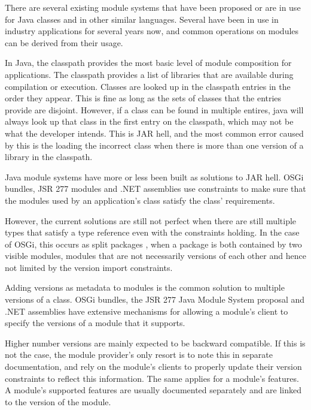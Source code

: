 There are several existing module systems that have been proposed or
are in use for Java classes and in other similar languages. 
Several \cite{javajars, OSGi4, netassemblies} have been in use in industry 
applications for several years now, and common operations on modules
can be derived from their usage.


In Java, the classpath provides the most basic level of module composition
for applications. The classpath provides a list of libraries that are
available during compilation or execution. Classes are looked up in the 
classpath entries in the order they appear. This is fine as long as the sets 
of classes that the entries provide are disjoint. However, if a class can 
be found in multiple entires, java will always look up that class in the 
first entry on the classpath, which may not be what the developer intends. 
This is JAR hell, and the most common error caused by this is the loading 
the incorrect class when there is more than one version of a library in the classpath.

Java module systems have more or less been built as solutions to JAR hell. 
OSGi \cite{OSGi4} bundles, JSR 277 \cite{JSR277} modules and .NET assemblies \cite{netassemblies}
use constraints to make sure that the modules used by an application's class satisfy the 
class' requirements. 

However, the current solutions are still not perfect when there are still multiple
types that satisfy a type reference even with the constraints holding. In the case
of OSGi, this occurs as split packages \cite{iJAMComments}, when a package is both contained by
two visible modules, modules that are not necessarily versions of each other
and hence not limited by the version import constraints.

Adding versions as metadata to modules is the common solution to multiple
versions of a class. OSGi bundles, the JSR 277 Java Module System
proposal and .NET assemblies 
have extensive mechanisms for allowing a module's client to specify the
versions of a module that it supports.

Higher number versions are mainly expected to be backward compatible. If this is not
the case, the module provider's only resort is to note this in separate documentation,
and rely on the module's clients to properly update their version constraints
to reflect this information. The same applies for a module's features. A module's
supported features are usually documented separately and are linked to the version
of the module.

